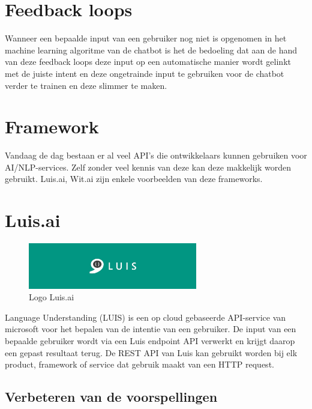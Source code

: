 \section{Feedback loops}
\label{sec:Feedback loops}

Wanneer een bepaalde input van een gebruiker nog niet is opgenomen in het machine learning algoritme van de chatbot is het de bedoeling dat aan de hand van deze feedback loops deze input op een automatische manier wordt gelinkt met de juiste intent en deze ongetrainde input te gebruiken voor de chatbot verder te trainen en deze slimmer te maken.

\section{Framework}
\label{sec:Framework}

Vandaag de dag bestaan er al veel API's die ontwikkelaars kunnen gebruiken voor AI/NLP-services. Zelf zonder veel kennis van deze kan deze makkelijk worden gebruikt. Luis.ai, Wit.ai zijn enkele voorbeelden van deze frameworks.

\section{Luis.ai}
\label{sec:Luis.ai}

\begin{figure}[h!]
	\centering
	\includegraphics[height=2cm]{luis.png}
	\caption{Logo Luis.ai ~\autocite{Kevin2017}}
	\label{fig:luis}
\end{figure}

Language Understanding (LUIS) is een op cloud gebaseerde API-service van microsoft voor het bepalen van de intentie van een gebruiker.  De input van een bepaalde gebruiker wordt via een Luis endpoint API verwerkt en krijgt daarop een gepast resultaat terug. De REST API van Luis kan gebruikt worden bij elk product, framework of service dat gebruik maakt van een HTTP request. ~\autocite{Dina2019}

\subsection{Verbeteren van de voorspellingen}
\label{verbeteren}

